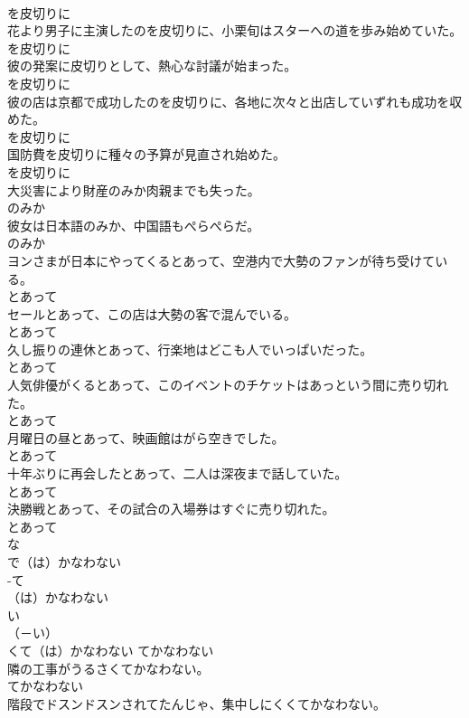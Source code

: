 \documentclass[8pt]{extreport}
\begin{document}
\begin{CJK}{UTF8}{min}
\\	を皮切りに
\\	花より男子に主演したのを皮切りに、小栗旬はスターへの道を歩み始めていた。	
\\	を皮切りに
\\	彼の発案に皮切りとして、熱心な討議が始まった。	
\\	を皮切りに
\\	彼の店は京都で成功したのを皮切りに、各地に次々と出店していずれも成功を収めた。	
\\	を皮切りに
\\	国防費を皮切りに種々の予算が見直され始めた。	
\\	を皮切りに
\\	大災害により財産のみか肉親までも失った。	
\\	のみか
\\	彼女は日本語のみか、中国語もぺらぺらだ。	
\\	のみか
\\	ヨンさまが日本にやってくるとあって、空港内で大勢のファンが待ち受けている。	
\\	とあって
\\	セールとあって、この店は大勢の客で混んでいる。	
\\	とあって
\\	久し振りの連休とあって、行楽地はどこも人でいっぱいだった。	
\\	とあって
\\	人気俳優がくるとあって、このイベントのチケットはあっという間に売り切れた。	
\\	とあって
\\	月曜日の昼とあって、映画館はがら空きでした。	
\\	とあって
\\	十年ぶりに再会したとあって、二人は深夜まで話していた。	
\\	とあって
\\	決勝戦とあって、その試合の入場券はすぐに売り切れた。	
\\	とあって
\\	な
\\	で（は）かなわない	
\\	-て
\\	（は）かなわない	
\\	い
\\	（－い） 
\\	くて（は）かなわない	てかなわない
\\	隣の工事がうるさくてかなわない。	
\\	てかなわない
\\	階段でドスンドスンされてたんじゃ、集中しにくくてかなわない。	

\end{CJK}
\end{document}
